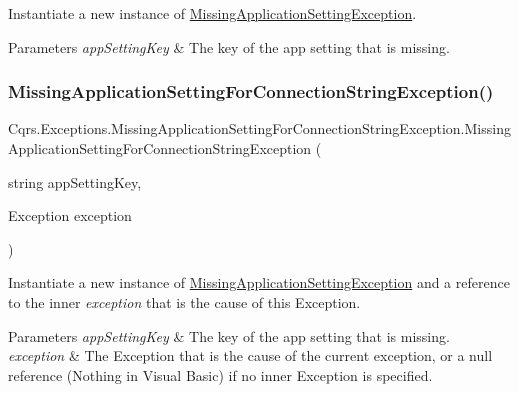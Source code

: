 Instantiate a new instance of \hyperlink{classCqrs_1_1Exceptions_1_1MissingApplicationSettingException}{Missing\+Application\+Setting\+Exception}. 


\begin{DoxyParams}{Parameters}
{\em app\+Setting\+Key} & The key of the app setting that is missing.\\
\hline
\end{DoxyParams}
\mbox{\label{classCqrs_1_1Exceptions_1_1MissingApplicationSettingForConnectionStringException_ac007052f2ab651e31647acbdbe2ce7e7_ac007052f2ab651e31647acbdbe2ce7e7}} 
\subsubsection{\texorpdfstring{Missing\+Application\+Setting\+For\+Connection\+String\+Exception()}{MissingApplicationSettingForConnectionStringException()}\hspace{0.1cm}{\footnotesize\ttfamily [2/2]}}
{\footnotesize\ttfamily Cqrs.\+Exceptions.\+Missing\+Application\+Setting\+For\+Connection\+String\+Exception.\+Missing\+Application\+Setting\+For\+Connection\+String\+Exception (\begin{DoxyParamCaption}\item[{string}]{app\+Setting\+Key,  }\item[{Exception}]{exception }\end{DoxyParamCaption})}



Instantiate a new instance of \hyperlink{classCqrs_1_1Exceptions_1_1MissingApplicationSettingException}{Missing\+Application\+Setting\+Exception} and a reference to the inner {\itshape exception}  that is the cause of this Exception. 


\begin{DoxyParams}{Parameters}
{\em app\+Setting\+Key} & The key of the app setting that is missing.\\
\hline
{\em exception} & The Exception that is the cause of the current exception, or a null reference (Nothing in Visual Basic) if no inner Exception is specified.\\
\hline
\end{DoxyParams}

